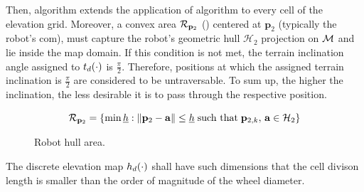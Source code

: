 Then, algorithm  extends the application of algorithm  to every cell of the elevation grid. Moreover, a convex area $\mathcal{R}_{\mathbf{p}_2}$ () centered at $\mathbf{p}_2$ (typically the robot's \acrshort{com}), must capture the robot's geometric hull $\mathcal{H}_2$ projection on $\mathcal{M}$ and lie inside the map domain. If this condition is not met, the terrain inclination angle assigned to $t_d(\cdot)$ is $\frac{\pi}{2}$. Therefore, positions at which the assigned terrain inclination is $\frac{\pi}{2}$ are considered to be untraversable. To sum up, the higher the inclination, the less desirable it is to pass through the respective position.

\begin{figure}[!htb]
  \begin{minipage}[c]{0.35\linewidth}
    \centering
  \end{minipage}
  \begin{minipage}[c]{0.6\linewidth}
    \centering
	\begin{equation}
		\mathcal{R}_{\mathbf{p}_2} = \{ \text{min} \, \underline{h}: \| \mathbf{p}_2 - \mathbf{a} \| \leq \underline{h}\;\text{such that}\;\mathbf{p}_{2, k},\,\mathbf{a} \in \mathcal{H}_2 \}
		\label{eq:robotHullArea}
	\end{equation}
  \end{minipage}
\caption{Robot hull area.}
\label{fig:robotHull}
\end{figure}

\begin{remark}
The discrete elevation map $h_d(\cdot)$ shall have such dimensions that the cell divison length is smaller than the order of magnitude of the wheel diameter.
\end{remark}

